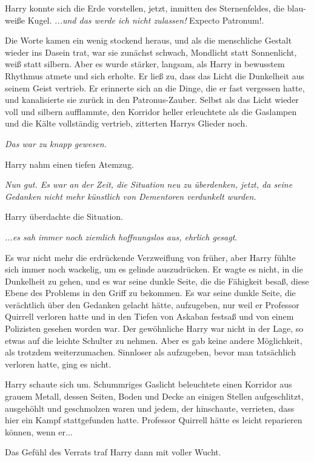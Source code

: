 Harry konnte sich die Erde vorstellen, jetzt, inmitten des Sternenfeldes, die
blau-weiße Kugel. \emph{...und das werde ich nicht zulassen!} \glqq{}Expecto
Patronum!\grqq{}.

Die Worte kamen ein wenig stockend heraus, und als die menschliche Gestalt
wieder ins Dasein trat, war sie zunächst schwach, Mondlicht statt Sonnenlicht,
weiß statt silbern. Aber es wurde stärker, langsam, als Harry in bewusstem
Rhythmus atmete und sich erholte. Er ließ zu, dass das Licht die Dunkelheit aus
seinem Geist vertrieb. Er erinnerte sich an die Dinge, die er fast vergessen
hatte, und kanalisierte sie zurück in den Patronus-Zauber. Selbst als das Licht
wieder voll und silbern aufflammte, den Korridor heller erleuchtete als die
Gaslampen und die Kälte vollständig vertrieb, zitterten Harrys Glieder noch.

\emph{Das war zu knapp gewesen.}

Harry nahm einen tiefen Atemzug.

\emph{Nun gut. Es war an der Zeit, die Situation neu zu überdenken, jetzt, da
seine Gedanken nicht mehr künstlich von Dementoren verdunkelt wurden.}

Harry überdachte die Situation.

\emph{...es sah immer noch ziemlich hoffnungslos aus, ehrlich gesagt}.

Es war nicht mehr die erdrückende Verzweiflung von früher, aber Harry fühlte
sich immer noch wackelig, um es gelinde auszudrücken. Er wagte es nicht, in die
Dunkelheit zu gehen, und es war seine dunkle Seite, die die Fähigkeit besaß,
diese Ebene des Problems in den Griff zu bekommen. Es war seine dunkle Seite,
die verächtlich über den Gedanken gelacht hätte, aufzugeben, nur weil er
Professor Quirrell verloren hatte und in den Tiefen von Askaban festsaß und von
einem Polizisten gesehen worden war. Der gewöhnliche Harry war nicht in der
Lage, so etwas auf die leichte Schulter zu nehmen. Aber es gab keine andere
Möglichkeit, als trotzdem weiterzumachen. Sinnloser als aufzugeben, bevor man
tatsächlich verloren hatte, ging es nicht.

Harry schaute sich um. Schummriges Gaslicht beleuchtete einen Korridor aus
grauem Metall, dessen Seiten, Boden und Decke an einigen Stellen aufgeschlitzt,
ausgehöhlt und geschmolzen waren und jedem, der hinschaute, verrieten, dass hier
ein Kampf stattgefunden hatte. Professor Quirrell hätte es leicht reparieren
können, wenn er...

Das Gefühl des Verrats traf Harry dann mit voller Wucht.

